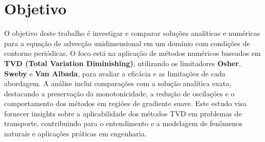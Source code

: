 \section{Objetivo}

O objetivo deste trabalho é investigar e comparar soluções analíticas e numéricas para a equação de advecção unidimensional em um domínio com condições de contorno periódicas. O foco está na aplicação de métodos numéricos baseados em \textbf{TVD (Total Variation Diminishing)}, utilizando os limitadores \textbf{Osher}, \textbf{Sweby} e \textbf{Van Albada}, para avaliar a eficácia e as limitações de cada abordagem. A análise inclui comparações com a solução analítica exata, destacando a preservação da monotonicidade, a redução de oscilações e o comportamento dos métodos em regiões de gradiente suave. Este estudo visa fornecer insights sobre a aplicabilidade dos métodos TVD em problemas de transporte, contribuindo para o entendimento e a modelagem de fenômenos naturais e aplicações práticas em engenharia.
